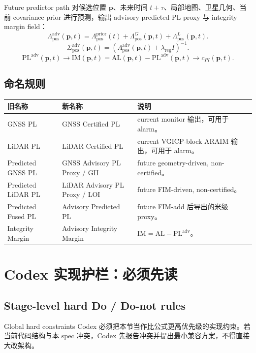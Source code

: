 \documentclass[11pt,a4paper]{article}
\newcommand{\PL}{\mathrm{PL}}
\newcommand{\AL}{\mathrm{AL}}
\newcommand{\IM}{\mathrm{IM}}
\newcommand{\Lam}{\Lambda}
\newcommand{\Sig}{\Sigma}
\newcommand{\pvec}{\mathbf{p}}
\newcommand{\pos}{\mathrm{pos}}
\newcommand{\adv}{\mathrm{adv}}
\newcommand{\prior}{\mathrm{prior}}
\begin{document}
Future predictor path 对候选位置 $\pvec$、未来时间 $t+\tau$、局部地图、卫星几何、当前 covariance prior 进行预测，输出 advisory predicted PL proxy 与 integrity margin field：
\[
  \Lam^{\adv}_{\pos}(\pvec,t)
  =
  \Lam^{\prior}_{\pos}(t)
  +
  \Lam^{G}_{\pos}(\pvec,t)
  +
  \Lam^{L}_{\pos}(\pvec,t).
\]
\[
  \Sig^{\adv}_{\pos}(\pvec,t)
  =
  \left(\Lam^{\adv}_{\pos}(\pvec,t)+\lambda_{\mathrm{reg}}I\right)^{-1}.
\]
\[
  \PL^{\adv}(\pvec,t)
  \rightarrow
  \IM(\pvec,t)=\AL(\pvec,t)-\PL^{\adv}(\pvec,t)
  \rightarrow
  c_{PI}(\pvec,t).
\]

\subsection{命名规则}

\begin{center}
  \small
  \begin{tabularx}{\linewidth}{l l Y}
    \toprule
    \textbf{旧名称} & \textbf{新名称} & \textbf{说明} \\
    \midrule
    GNSS PL & GNSS Certified PL & current monitor 输出，可用于 alarm。\\
    LiDAR PL & LiDAR Certified PL & current VGICP-block ARAIM 输出，可用于 alarm。\\
    Predicted GNSS PL & GNSS Advisory PL Proxy / GII & future geometry-driven, non-certified。\\
    Predicted LiDAR PL & LiDAR Advisory PL Proxy / LOI & future FIM-driven, non-certified。\\
    Predicted Fused PL & Advisory Predicted PL & future FIM-add 后导出的米级 proxy。\\
    Integrity Margin & Advisory Integrity Margin & $\IM=\AL-\PL^{\adv}$。\\
    \bottomrule
  \end{tabularx}
\end{center}


\section{Codex 实现护栏：必须先读}

\subsection{Stage-level hard Do / Do-not rules}

\begin{warningbox}{Global hard constraints}
Codex 必须把本节当作比公式更高优先级的实现约束。若当前代码结构与本 spec 冲突，Codex 先报告冲突并提出最小兼容方案，不得直接大改架构。
\end{warningbox}
\end{document}
